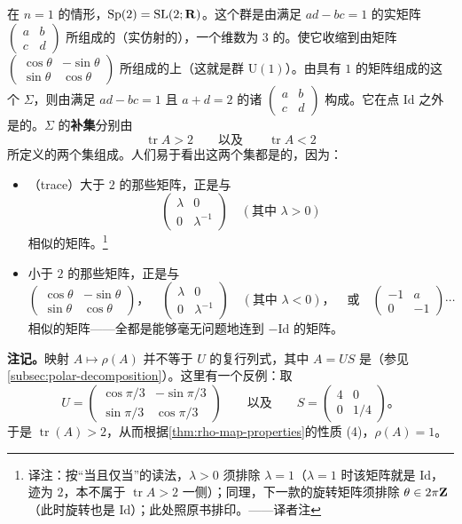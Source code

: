 在 $n=1$ 的情形，$\mathrm{Sp}(2)=\mathrm{SL}(2;\mathbf{R})$。这个群是由满足 $ad-bc=1$ 的实矩阵 $\begin{pmatrix}a&b\\c&d\end{pmatrix}$ 所组成的（实仿射的）\trQuadric，一个维数为 $3$ 的\trSubmanifold。\trPolarDecomposition{}使它收缩到由矩阵 $\begin{pmatrix}\cos\theta&-\sin\theta\\ \sin\theta&\cos\theta\end{pmatrix}$ 所组成的\trCircle{}上（这就是群 $\mathrm{U}(1)$）。由具有\trEigenvalue{} $1$ 的矩阵组成的这个\trHypersurface{} $\Sigma$，则由满足 $ad-bc=1$ 且 $a+d=2$ 的诸 $\begin{pmatrix}a&b\\c&d\end{pmatrix}$ 构成。它在点 $\mathrm{Id}$ 之外是\trSmooth{}的。$\Sigma$ 的\textbf{补集}分别由
\[
\operatorname{tr}A>2\qquad\text{以及}\qquad \operatorname{tr}A<2
\]
所定义的两个\trOpen{}集组成。人们易于看出这两个\trOpen{}集都是\trConnected{}的，因为：
\begin{itemize}
\item \textbf{\trTrace{}}（trace）大于 $2$ 的那些矩阵，正是与
\[
\begin{pmatrix}\lambda&0\\0&\lambda^{-1}\end{pmatrix}\quad(\text{其中 }\lambda>0)
\]
相似的矩阵。\footnote{译注：按“当且仅当”的读法，$\lambda>0$ 须排除 $\lambda=1$（$\lambda=1$ 时该矩阵就是 $\mathrm{Id}$，迹为 $2$，本不属于 $\operatorname{tr}A>2$ 一侧）；同理，下一款的旋转矩阵须排除 $\theta\in2\pi\mathbf{Z}$（此时旋转也是 $\mathrm{Id}$）；此处照原书排印。——译者注}
\item \trTrace{}小于 $2$ 的那些矩阵，正是与
\[
\begin{pmatrix}\cos\theta&-\sin\theta\\ \sin\theta&\cos\theta\end{pmatrix}\text{，}\quad \begin{pmatrix}\lambda&0\\0&\lambda^{-1}\end{pmatrix}\quad(\text{其中 }\lambda<0)\text{，}\quad\text{或}\quad \begin{pmatrix}-1&a\\0&-1\end{pmatrix}\cdots
\]
相似的矩阵——全都是能够毫无问题地连到 $-\mathrm{Id}$ 的矩阵。
\end{itemize}

\noindent\textbf{注记。}映射 $A\mapsto\rho(A)$ 并不等于 $U$ 的复行列式，其中 $A=US$ 是\trPolarDecomposition（参见\cref{subsec:polar-decomposition}）。这里有一个反例：取
\[
U=\begin{pmatrix}\cos\pi/3&-\sin\pi/3\\ \sin\pi/3&\cos\pi/3\end{pmatrix}\qquad\text{以及}\qquad S=\begin{pmatrix}4&0\\0&1/4\end{pmatrix}\text{。}
\]
于是 $\operatorname{tr}(A)>2$，从而根据\cref{thm:rho-map-properties}的性质 (4)，$\rho(A)=1$。

